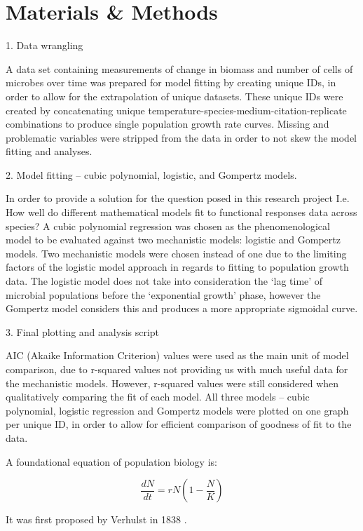 \documentclass[11pt]{article}
\begin{document}
  \section{Materials \& Methods}
    1. Data wrangling

    A data set containing measurements of change in biomass and number of cells of microbes over time was prepared for model fitting by creating unique IDs, in order to allow for the extrapolation of unique datasets. These unique IDs were created by concatenating unique temperature-species-medium-citation-replicate combinations to produce single population growth rate curves. Missing and problematic variables were stripped from the data in order to not skew the model fitting and analyses. 

    2. Model fitting – cubic polynomial, logistic, and Gompertz models. 

    In order to provide a solution for the question posed in this research project I.e. How well do different mathematical models fit to functional responses data across species? A cubic polynomial regression was chosen as the phenomenological model to be evaluated against two mechanistic models: logistic and Gompertz models. Two mechanistic models were chosen instead of one due to the limiting factors of the logistic model approach in regards to fitting to population growth data. The logistic model does not take into consideration the ‘lag time’ of microbial populations before the ‘exponential growth’ phase, however the Gompertz model considers this and produces a more appropriate sigmoidal curve.

    3. Final plotting and analysis script

    AIC (Akaike Information Criterion) values were used as the main unit of model comparison, due to r-squared values not providing us with much useful data for the mechanistic models. However, r-squared values were still considered when qualitatively comparing the fit of each model. All three models – cubic polynomial, logistic regression and Gompertz models were plotted on one graph per unique ID, in order to allow for efficient comparison of goodness of fit to the data. 
 
     A foundational equation of population biology is:
  
  \begin{equation}
    \frac{dN}{dt} = r N (1 - \frac{N}{K})
  \end{equation}
  
  It was first proposed by Verhulst in 1838 \cite{verhulst1838notice}.
  
  
  
  
\end{document}
